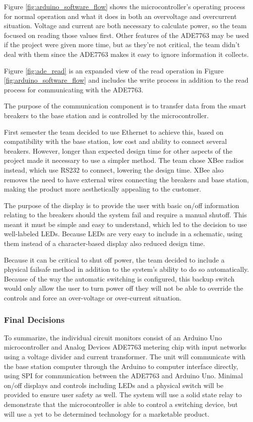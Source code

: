 Figure \ref{fig:arduino_software_flow} shows the microcontroller's operating process for normal operation and what it does in both an over\-voltage and over\-current situation. Voltage and current are both necessary to calculate power, so the team focused on reading those values first. Other features of the ADE7763 may be used if the project were given more time, but as they're not critical, the team didn't deal with them since the ADE7763 makes it easy to ignore information it collects. 

Figure \ref{fig:ade_read} is an expanded view of the read operation in Figure \ref{fig:arduino_software_flow} and includes the write process in addition to the read process for communicating with the ADE7763.

The purpose of the communication component is to transfer data from the smart breakers to the base station and is controlled by the microcontroller. 

First semester the team decided to use Ethernet to achieve this, based on compatibility with the base station, low cost and ability to connect several breakers. However, longer than expected design time for other aspects of the project made it necessary to use a simpler method. The team chose XBee radios instead, which use RS232 to connect, lowering the design time. XBee also removes the need to have external wires connecting the breakers and base station, making the product more aesthetically appealing to the customer. 

The purpose of the display is to provide the user with basic on/off information relating to the breakers should the system fail and require a manual shutoff. This meant it must be simple and easy to understand, which led to the decision to use well-labeled LEDs. Because LEDs are very easy to include in a schematic, using them instead of a character-based display also reduced design time.  

Because it can be critical to shut off power, the team decided to include a physical failsafe method in addition to the system's ability to do so automatically. Because of the way the automatic switching is configured, this backup switch would only allow the user to turn power off \- they will not be able to override the controls and force an over-voltage or over-current situation.

\subsubsection{Final Decisions}
To summarize, the individual circuit monitors consist of an Arduino Uno microcontroller and Analog Devices ADE7763 metering chip with input networks using a voltage divider and current transformer. The unit will communicate with the base station computer through the Arduino to computer interface directly, using SPI for communication between the ADE7763 and Arduino Uno. Minimal on/off displays and controls including LEDs and a physical switch will be provided to ensure user safety as well. The system will use a solid state relay to demonstrate that the microcontroller is able to control a switching device, but will use a yet to be determined technology for a marketable product.

